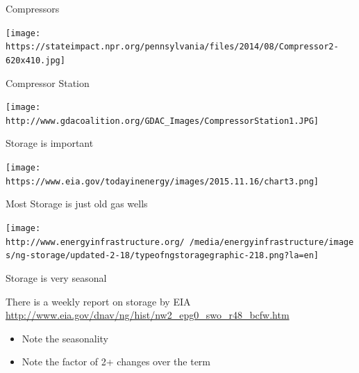 \documentclass[
  ignorenonframetext,
]{beamer}
\providecommand{\tightlist}{%
  \setlength{\itemsep}{0pt}\setlength{\parskip}{0pt}}
\begin{document}
\begin{frame}{Compressors}
\protect\hypertarget{compressors}{}

\texttt{[image: https://stateimpact.npr.org/pennsylvania/files/2014/08/Compressor2-620x410.jpg]}

\end{frame}

\begin{frame}{Compressor Station}
\protect\hypertarget{compressor-station}{}

\texttt{[image: http://www.gdacoalition.org/GDAC\_Images/CompressorStation1.JPG]}

\end{frame}

\begin{frame}{Storage is important}
\protect\hypertarget{storage-is-important}{}

\texttt{[image: https://www.eia.gov/todayinenergy/images/2015.11.16/chart3.png]}

\end{frame}

\begin{frame}{Most Storage is just old gas wells}
\protect\hypertarget{most-storage-is-just-old-gas-wells}{}

\texttt{[image: http://www.energyinfrastructure.org/~/media/energyinfrastructure/images/ng-storage/updated-2-18/typeofngstoragegraphic-218.png?la=en]}

\end{frame}

\begin{frame}{Storage is very seasonal}
\protect\hypertarget{storage-is-very-seasonal}{}

There is a weekly report on storage by EIA
\url{http://www.eia.gov/dnav/ng/hist/nw2_epg0_swo_r48_bcfw.htm}

\begin{itemize}
\tightlist
\item
  Note the seasonality
\item
  Note the factor of 2+ changes over the term
\end{itemize}

\end{frame}
\end{document}
